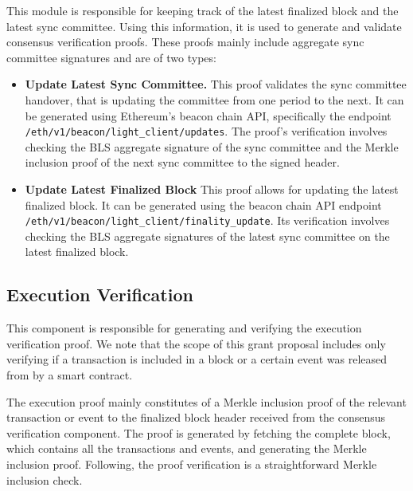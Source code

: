 This module is responsible for keeping track of the latest finalized block and
the latest sync committee. Using this information, it is used to generate and
validate consensus verification proofs. These proofs mainly include aggregate
sync committee signatures and are of two types:
\begin{itemize}
    \item \textbf{Update Latest Sync Committee.} This proof validates the sync
        committee handover, that is updating the committee from one period to
        the next. It can be generated using Ethereum's beacon chain API,
        specifically the endpoint
        \texttt{/eth/v1/beacon/light\_client/updates}.
        The proof's verification involves checking the BLS aggregate signature
        of the sync committee and the Merkle inclusion proof of the next sync
        committee to the signed header.
    \item \textbf{Update Latest Finalized Block} This proof allows for updating
        the latest finalized block. It can be generated using the beacon chain
        API endpoint \texttt{/eth/v1/beacon/light\_client/finality\_update}.
        Its verification involves checking the BLS aggregate signatures of the
        latest sync committee on the latest finalized block.
\end{itemize}

\subsection{Execution Verification}

This component is responsible for generating and verifying the execution
verification proof. We note that the scope of this grant proposal includes only
verifying if a transaction is included in a block or a certain event was
released from by a smart contract. 

The execution proof mainly constitutes of a Merkle inclusion proof of the
relevant transaction or event to the finalized block header received from the
consensus verification component. The proof is generated by fetching the
complete block, which contains all the transactions and events, and generating
the Merkle inclusion proof. Following, the proof verification is a
straightforward Merkle inclusion check.
